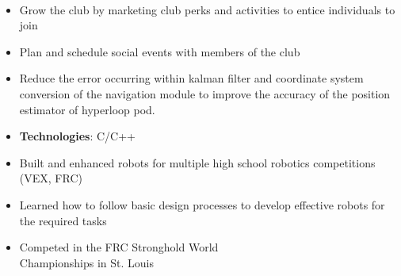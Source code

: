 \documentclass[10pt, letterpaper, ragged2e, withhyper]{altacv}
\begin{document}
\begin{paracol}{2}
    \divider
    
    \\







    \begin{itemize}
        \item Grow the club by marketing club perks and activities to entice individuals to join
        \item Plan and schedule social events with members of the club
    \end{itemize}

    \divider
    
    \begin{itemize}
        \item Reduce the error occurring within kalman filter and coordinate system conversion of the navigation
        module to improve the accuracy of the position estimator of hyperloop pod.  
        \item \textbf{Technologies}: C/C++
    \end{itemize}

    \divider

    \begin{itemize}
        \item Built and enhanced robots for multiple high school robotics competitions (VEX, FRC)
        \item Learned how to follow basic design processes to develop effective robots for the required tasks
        \item Competed in the FRC Stronghold World\\ Championships in St. Louis 
    \end{itemize}
     
    \divider


\end{paracol}
\end{document}
